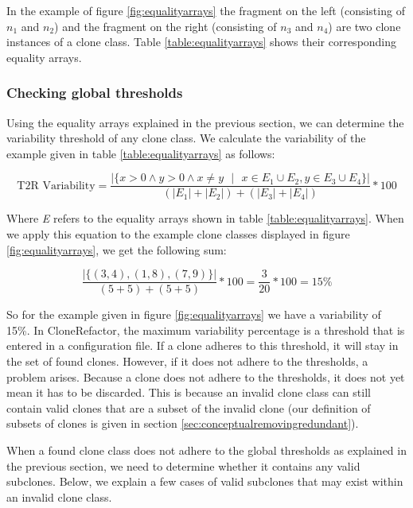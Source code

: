 In the example of figure \ref{fig:equalityarrays} the fragment on the left (consisting of $n_1$ and $n_2$) and the fragment on the right (consisting of $n_3$ and $n_4$) are two clone instances of a clone class. Table \ref{table:equalityarrays} shows their corresponding equality arrays.

\subsubsection{Checking global thresholds} \label{sec:t2rcheckglobalthres}
Using the equality arrays explained in the previous section, we can determine the variability threshold of any clone class. We calculate the variability of the example given in table \ref{table:equalityarrays} as follows:

\begin{equation}\label{eq:variabilityclonerefactor}
\text{T2R Variability} = \frac{|\{x>0 \land y>0 \land x \neq y\text{ }|\text{ }x \in E_1 \cup E_2, y \in E_3 \cup E_4\}|}{(|E_1|+|E_2|)+(|E_3|+|E_4|)}*100
\end{equation}

Where \textit{E} refers to the equality arrays shown in table \ref{table:equalityarrays}. When we apply this equation to the example clone classes displayed in figure \ref{fig:equalityarrays}, we get the following sum:

\begin{equation}\label{eq:sumequality}
\frac{|\{(3,4), (1,8), (7,9)\}|}{(5+5)+(5+5)}*100 = \frac{3}{20}*100 = 15\%
\end{equation}

So for the example given in figure \ref{fig:equalityarrays} we have a variability of 15\%. In CloneRefactor, the maximum variability percentage is a threshold that is entered in a configuration file. If a clone adheres to this threshold, it will stay in the set of found clones. However, if it does not adhere to the thresholds, a problem arises. Because a clone does not adhere to the thresholds, it does not yet mean it has to be discarded. This is because an invalid clone class can still contain valid clones that are a subset of the invalid clone (our definition of subsets of clones is given in section \ref{sec:conceptualremovingredundant}).



When a found clone class does not adhere to the global thresholds as explained in the previous section, we need to determine whether it contains any valid subclones. Below, we explain a few cases of valid subclones that may exist within an invalid clone class.

